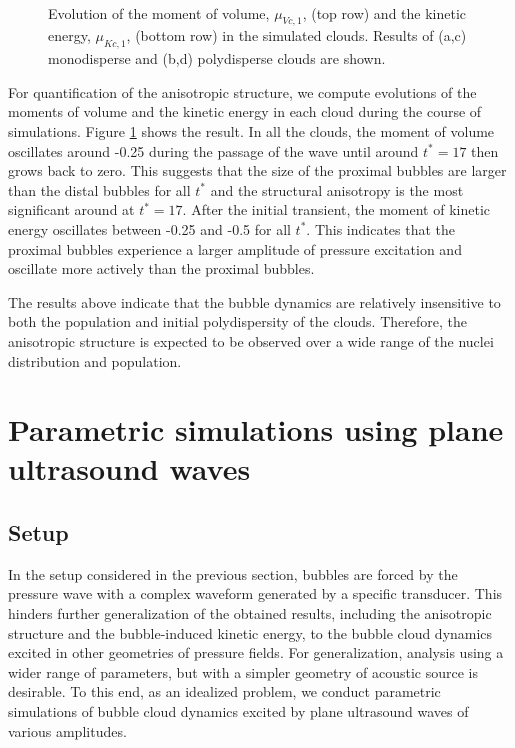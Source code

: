\documentclass{jfm}
\begin{document}
\begin{figure}
  \center
  \\
  \caption{Evolution of the moment of volume, $\mu_{Vc,1}$, (top row) and the kinetic energy, $\mu_{Kc,1}$, (bottom row) in the simulated clouds. Results of (a,c) monodisperse and (b,d) polydisperse clouds are shown.}
   \label{fig:focus_moment} 
\end{figure}
For quantification of the anisotropic structure, we compute evolutions of the moments of volume and the kinetic energy in each cloud during the course of simulations.
Figure \ref{fig:focus_moment} shows the result.
In all the clouds, the moment of volume oscillates around -0.25 during the passage of the wave until around $t^*=17$ then grows back to zero. This suggests that the size of the proximal bubbles are larger than the distal bubbles for all $t^*$ and the structural anisotropy is the most significant around at $t^*=17$.
After the initial transient, the moment of kinetic energy oscillates between -0.25 and -0.5 for all $t^*$.
This indicates that the proximal bubbles experience a larger amplitude of pressure excitation and oscillate more actively than the proximal bubbles.

The results above indicate that the bubble dynamics are relatively insensitive to both the population and initial polydispersity of the clouds.
Therefore, the anisotropic structure is expected to be observed over a wide range of the nuclei distribution and population.

\section{Parametric simulations using plane ultrasound waves}
\label{section:parametric}
\subsection{Setup}
In the setup considered in the previous section, bubbles are forced by the pressure wave with a complex waveform generated by a specific transducer.
This hinders further generalization of the obtained results, including the anisotropic structure and the bubble-induced kinetic energy, to the bubble cloud dynamics excited in other geometries of pressure fields.
For generalization, analysis using a wider range of parameters, but with a simpler geometry of acoustic source is desirable.
To this end, as an idealized problem, we conduct parametric simulations of bubble cloud dynamics excited by plane ultrasound waves of various amplitudes.
\end{document}
